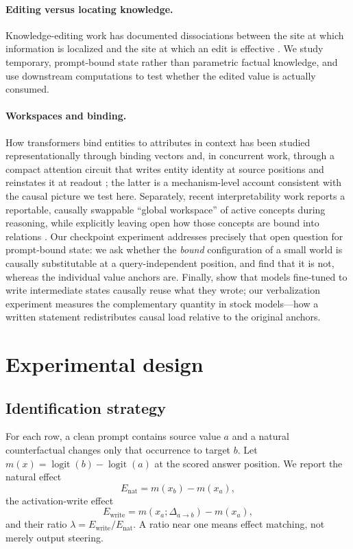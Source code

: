 \documentclass[10pt]{article}
\begin{document}
\paragraph{Editing versus locating knowledge.}
Knowledge-editing work has documented dissociations between the site at which
information is localized and the site at which an edit is effective
\citep{hase2023localization}. We study temporary, prompt-bound state rather than
parametric factual knowledge, and use downstream computations to test whether
the edited value is actually consumed.

\paragraph{Workspaces and binding.}
How transformers bind entities to attributes in context has been studied
representationally through binding vectors \citep{feng2023binding} and, in
concurrent work, through a compact attention circuit that writes entity
identity at source positions and reinstates it at readout
\citep{oh2026rebinding}; the latter is a mechanism-level account consistent
with the causal picture we test here. Separately, recent interpretability
work reports a reportable, causally swappable ``global workspace'' of active
concepts during reasoning, while explicitly leaving open how those concepts
are bound into relations \citep{anthropic2026workspace}. Our checkpoint
experiment addresses precisely that open question for prompt-bound state: we
ask whether the \emph{bound} configuration of a small world is causally
substitutable at a query-independent position, and find that it is not,
whereas the individual value anchors are. Finally, \citet{shih2026registers}
show that models fine-tuned to write intermediate states causally reuse what
they wrote; our verbalization experiment measures the complementary quantity
in stock models---how a written statement redistributes causal load relative
to the original anchors.

\section{Experimental design}

\subsection{Identification strategy}

For each row, a clean prompt contains source value $a$ and a natural
counterfactual changes only that occurrence to target $b$. Let
$m(x)=\operatorname{logit}(b)-\operatorname{logit}(a)$ at the scored answer
position. We report the natural effect
\begin{equation}
 E_{\mathrm{nat}}=m(x_b)-m(x_a),
\end{equation}
the activation-write effect
\begin{equation}
 E_{\mathrm{write}}=m(x_a;\Delta_{a\rightarrow b})-m(x_a),
\end{equation}
and their ratio $\lambda=E_{\mathrm{write}}/E_{\mathrm{nat}}$. A ratio near
one means effect matching, not merely output steering.
\end{document}
